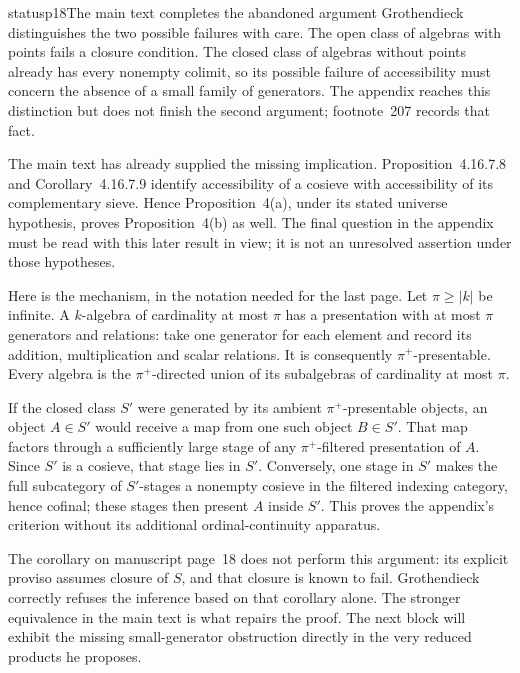 \begin{dcomment}{status}{p18}{The main text completes the abandoned argument}
Grothendieck distinguishes the two possible failures with care. The open class of algebras with points fails a closure condition. The closed class of algebras without points already has every nonempty colimit, so its possible failure of accessibility must concern the absence of a small family of generators. The appendix reaches this distinction but does not finish the second argument; footnote~207 records that fact.

The main text has already supplied the missing implication. Proposition~4.16.7.8 and Corollary~4.16.7.9 identify accessibility of a cosieve with accessibility of its complementary sieve. Hence Proposition~4(a), under its stated universe hypothesis, proves Proposition~4(b) as well. The final question in the appendix must be read with this later result in view; it is not an unresolved assertion under those hypotheses.

Here is the mechanism, in the notation needed for the last page. Let $\pi\ge|k|$ be infinite. A $k$-algebra of cardinality at most $\pi$ has a presentation with at most $\pi$ generators and relations: take one generator for each element and record its addition, multiplication and scalar relations. It is consequently $\pi^+$-presentable. Every algebra is the $\pi^+$-directed union of its subalgebras of cardinality at most $\pi$.

If the closed class $S'$ were generated by its ambient $\pi^+$-presentable objects, an object $A\in S'$ would receive a map from one such object $B\in S'$. That map factors through a sufficiently large stage of any $\pi^+$-filtered presentation of $A$. Since $S'$ is a cosieve, that stage lies in $S'$. Conversely, one stage in $S'$ makes the full subcategory of $S'$-stages a nonempty cosieve in the filtered indexing category, hence cofinal; these stages then present $A$ inside $S'$. This proves the appendix's criterion without its additional ordinal-continuity apparatus.

The corollary on manuscript page~18 does not perform this argument: its explicit proviso assumes closure of $S$, and that closure is known to fail. Grothendieck correctly refuses the inference based on that corollary alone. The stronger equivalence in the main text is what repairs the proof. The next block will exhibit the missing small-generator obstruction directly in the very reduced products he proposes.
\end{dcomment}


